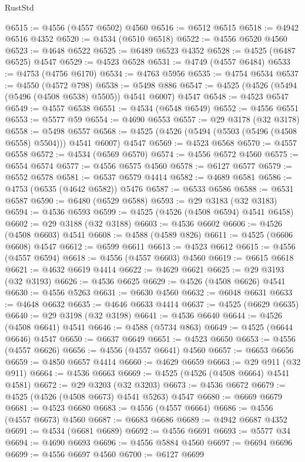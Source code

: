 \begin{lexlean}{RustStd}
\begin{coremodule}
{\begin{coremodule}
{{{{{{{{{{{{{{{{{{{{{{{{{{{{{{{{{{{{{{{{{{{{{{{{{{{{{{{@6515 := @4556 (@4557 @6502) @4560
@6516 := @6512 @6515
@6518 := @4942 @6516 @4352
@6520 := @4534 (@6510 @6518)
@6522 := @4556 @6520 @4560
@6523 := @4648 @6522
@6525 := @6489 @6523 @4352
@6528 := @4525 (@6487 @6525) @4547
@6529 := @4523 @6528
@6531 := @4749 (@4557 @6484)
@6533 := @4753 (@4756 @6170)
@6534 := @4763 @5956
@6535 := @4754 @6534
@6537 := @4550 (@4572 @798)
@6538 := @5498 @886
@6547 := @4525 (@4526 (@5494 (@5496 (@4508 @6538) @5505)) @4541 @6007) @4547
@6548 := @4523 @6547
@6549 := @4557 @6538
@6551 := @4534 (@6548 @6549)
@6552 := @4556 @6551
@6553 := @5577 @59
@6554 := @4690 @6553
@6557 := @29 @3178 (@32 @3178)
@6558 := @5498 @6557
@6568 := @4525 (@4526 (@5494 (@5503 (@5496 (@4508 @6558) @5504))) @4541 @6007) @4547
@6569 := @4523 @6568
@6570 := @4557 @6558
@6572 := @4534 (@6569 @6570)
@6574 := @4556 @6572 @4560
@6575 := @6554 @6574
@6577 := @4556 @6575 @4560
@6578 := @6127 @6577
@6579 := @6552 @6578
@6581 := @6537 @6579 @4414
@6582 := @4689 @6581
@6586 := @4753 (@6535 (@4642 @6582)) @5476
@6587 := @6533 @6586
@6588 := @6531 @6587
@6590 := @6480 (@6529 @6588)
@6593 := @29 @3183 (@32 @3183)
@6594 := @4536 @6593
@6599 := @4525 (@4526 (@4508 @6594) @4541 @6458)
@6602 := @29 @3188 (@32 @3188)
@6603 := @4536 @6602
@6606 := @4526 (@4508 @6603) @4541
@6608 := @4588 (@4589 @826)
@6611 := @4525 (@6606 @6608) @4547
@6612 := @6599 @6611
@6613 := @4523 @6612
@6615 := @4556 (@4557 @6594)
@6618 := @4556 (@4557 @6603) @4560
@6619 := @6615 @6618
@6621 := @4632 @6619 @4414
@6622 := @4629 @6621
@6625 := @29 @3193 (@32 @3193)
@6626 := @4536 @6625
@6629 := @4526 (@4508 @6626) @4541
@6630 := @4556 @5263
@6631 := @6630 @4560
@6632 := @6048 @6631
@6633 := @4648 @6632
@6635 := @4646 @6633 @4414
@6637 := @4525 (@6629 @6635)
@6640 := @29 @3198 (@32 @3198)
@6641 := @4536 @6640
@6644 := @4526 (@4508 @6641) @4541
@6646 := @4588 (@5734 @863)
@6649 := @4525 (@6644 @6646) @4547
@6650 := @6637 @6649
@6651 := @4523 @6650
@6653 := @4556 (@4557 @6626)
@6656 := @4556 (@4557 @6641) @4560
@6657 := @6653 @6656
@6659 := @4850 @6657 @4414
@6660 := @4629 @6659
@6663 := @29 @911 (@32 @911)
@6664 := @4536 @6663
@6669 := @4525 (@4526 (@4508 @6664) @4541 @4581)
@6672 := @29 @3203 (@32 @3203)
@6673 := @4536 @6672
@6679 := @4525 (@4526 (@4508 @6673) @4541 @5263) @4547
@6680 := @6669 @6679
@6681 := @4523 @6680
@6683 := @4556 (@4557 @6664)
@6686 := @4556 (@4557 @6673) @4560
@6687 := @6683 @6686
@6689 := @4942 @6687 @4352
@6691 := @4534 (@6681 @6689)
@6692 := @4556 @6691
@6693 := @5577 @34
@6694 := @4690 @6693
@6696 := @4556 @5884 @4560
@6697 := @6694 @6696
@6699 := @4556 @6697 @4560
@6700 := @6127 @6699
}}}}}}}}}}}}}}}}}}}}}}}}}}}}}}}}}}}}}}}}}}}}}}}}}}}}}}}
\end{coremodule}}
\end{coremodule}
\end{lexlean}
